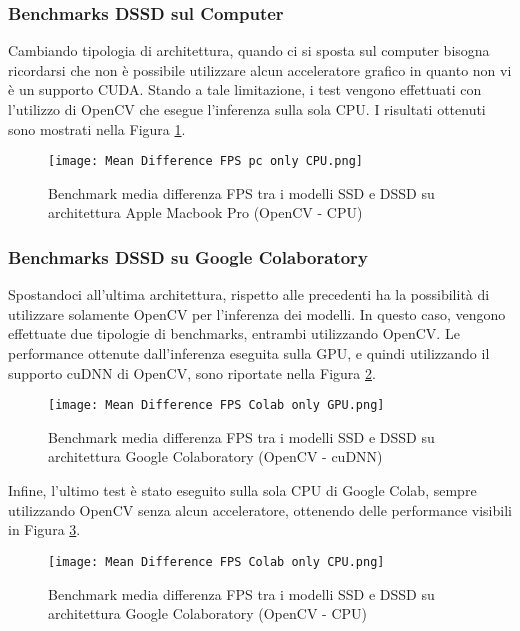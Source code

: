 \subsubsection{Benchmarks DSSD sul Computer}
Cambiando tipologia di architettura, quando ci si sposta sul computer bisogna ricordarsi che non è possibile utilizzare alcun acceleratore grafico in quanto non vi è un supporto CUDA. Stando a tale limitazione, i test vengono effettuati con l'utilizzo di OpenCV che esegue l'inferenza sulla sola CPU. I risultati ottenuti sono mostrati nella Figura \ref{bench-pc-cv2-CPU}.
\begin{figure}
    \centering
    \texttt{[image: Mean Difference FPS pc only CPU.png]}
    \centering
    \caption{Benchmark media differenza FPS tra i modelli SSD e DSSD su architettura Apple Macbook Pro (OpenCV - CPU)}
    \label{bench-pc-cv2-CPU}
\end{figure}

\subsubsection{Benchmarks DSSD su Google Colaboratory}
Spostandoci all'ultima architettura, rispetto alle precedenti ha la possibilità di utilizzare solamente OpenCV per l'inferenza dei modelli. In questo caso, vengono effettuate due tipologie di benchmarks, entrambi utilizzando OpenCV. 
Le performance ottenute dall'inferenza eseguita sulla GPU, e quindi utilizzando il supporto cuDNN di OpenCV, sono riportate nella Figura \ref{bench-colab-cv2-cudnn}.
\begin{figure}
    \centering
    \texttt{[image: Mean Difference FPS Colab only GPU.png]}
    \centering
    \caption{Benchmark media differenza FPS tra i modelli SSD e DSSD su architettura Google Colaboratory (OpenCV - cuDNN)}
    \label{bench-colab-cv2-cudnn}
\end{figure}
Infine, l'ultimo test è stato eseguito sulla sola CPU di Google Colab, sempre utilizzando OpenCV senza alcun acceleratore, ottenendo delle performance visibili in Figura \ref{bench-colab-cv2-cpu}.
\begin{figure}
    \centering
    \texttt{[image: Mean Difference FPS Colab only CPU.png]}
    \centering
    \caption{Benchmark media differenza FPS tra i modelli SSD e DSSD su architettura Google Colaboratory (OpenCV - CPU)}
    \label{bench-colab-cv2-cpu}
\end{figure}

